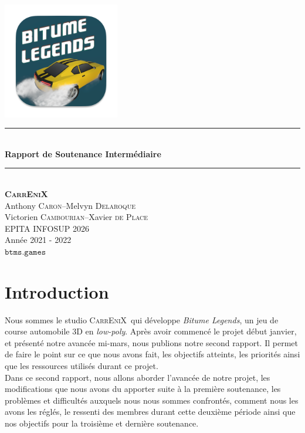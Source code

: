 \documentclass[12pt,a4paper]{article}
\newcommand{\btmlgs}{\textsl{Bitume Legends}}
\newcommand{\CEX}{\textsc{CarrEniX}}
\newcommand{\SITE}{\(\mathtt{btms.games}\)}
\begin{document}
    \begin{titlepage}
        \newcommand{\HRule}{\rule{\linewidth}{0.5mm}}
        \center
        \text{\LARGE Projet \btmlgs}\\[1cm]
        \includegraphics[scale=0.7]{logo192.png} \\[1cm]
        \HRule \\[0.4cm]
        { \huge \bfseries Rapport de Soutenance Intermédiaire\\[0.3cm] }
        \HRule \\[1.5cm]
        {\large \bfseries \CEX} \\[0.3cm]
        Anthony \textsc{Caron}\;--\;Melvyn \textsc{Delaroque}\\
        Victorien \textsc{Cambourian}\;--\;Xavier \textsc{de Place}
        \\ [4.5cm]
        EPITA INFOSUP 2026\\Année 2021 - 2022\\
        \SITE
    \end{titlepage}

    \tableofcontents
    \clearpage

    \section*{Introduction}
        Nous sommes le studio \CEX\, qui développe \btmlgs, un jeu de course automobile 3D en
        \textsl{low-poly}. Après avoir commencé le projet début janvier, et présenté notre avancée 
        mi-mars, nous publions notre second rapport. Il permet de faire le point sur ce que nous avons
        fait, les objectifs atteints, les priorités ainsi que les ressources utilisés durant ce 
        projet.\\
        Dans ce second rapport, nous allons aborder l'avancée de notre projet, les modifications que 
        nous avons du apporter suite à la première soutenance, les problèmes et difficultés auxquels 
        nous nous sommes confrontés, comment nous les avons les réglés, le ressenti des membres durant 
        cette deuxième période ainsi que nos objectifs pour la troisième et dernière soutenance.
\end{document}
